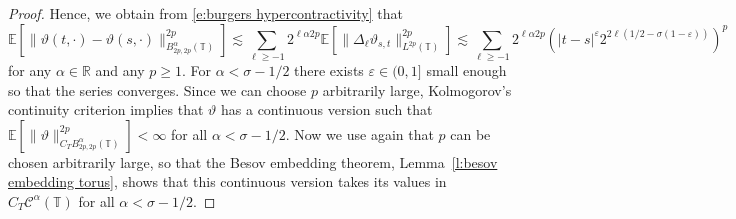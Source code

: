 \documentclass[11pt,a4paper]{article}
\newcommand{\mathD}{\mathrm{D}}
\newcommand{\tmop}[1]{\ensuremath{\operatorname{#1}}}
\theoremstyle{remark}
\newcommand{\R}{\mathbb{R}}
\newcommand{\E}{\mathbb{E}}
\newcommand{\CC}{\ensuremath{\mathscr{C}}}
\begin{document}
\begin{proof}
   Hence, we obtain from \eqref{e:burgers hypercontractivity} that
   \[
      \E[\lVert \vartheta(t, \cdot) - \vartheta(s,\cdot)\rVert_{B^\alpha_{2p,2p}(\mathbb{T})}^{2p} ] \lesssim \sum_{\ell \ge -1} 2^{\ell \alpha 2p} \E [\lVert \Delta_\ell \vartheta_{s,t}\rVert_{L^{2p}(\mathbb{T})}^{2p} ] \lesssim \sum_{\ell \ge -1} 2^{\ell \alpha 2p} \left(|t-s|^{\varepsilon} 2^{2\ell(1/2 - \sigma (1-\varepsilon))}\right)^p
   \]
   for any $\alpha \in \R$ and any $p \ge 1$. For $\alpha < \sigma - 1/2$ there exists $\varepsilon \in (0,1]$ small enough so that the series converges. Since we can choose $p$ arbitrarily large, Kolmogorov's continuity criterion %
   implies that $\vartheta$ has a continuous version such that $\E[ \|\vartheta \|_{C_T B^{\alpha}_{2 p, 2 p}(\mathbb{T})}^{2p}]< \infty$ for all $\alpha < \sigma - 1/2$. Now we use again that $p$ can be chosen arbitrarily large, so that the Besov embedding theorem, Lemma~\ref{l:besov embedding torus}, shows that this continuous version takes its values in $C_T \CC^{\alpha}(\mathbb{T})$ for all $\alpha < \sigma - 1/2$.
\end{proof}

%
\end{document}
